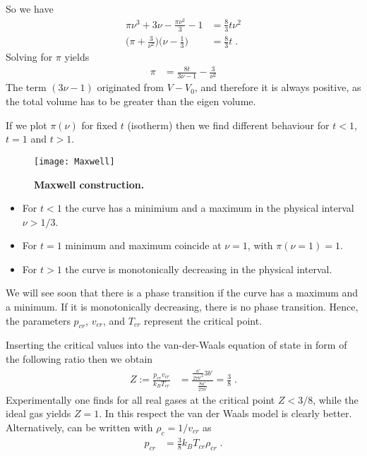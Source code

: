 %
So we have
%
\begin{align}\label{eq:auxaux}
\pi \nu^{3} + 3 \nu -  \frac{\pi \nu^{2}}{3} - 1 &= \frac{8}{3}t \nu^{2}\\
\bigg( \pi + \frac{3}{\nu^{2}} \bigg)\bigg( \nu - \frac{1}{3} \bigg) &=\frac{8}{3} t\;.
\end{align}
%
Solving for $\pi$ yields
%
\begin{align*}
\pi &= \frac{8t}{3 \nu-1 } - \frac{3}{\nu^{2}}
\end{align*}
%
The term $(3\nu-1)$ originated from $V-V_{0}$, and therefore it is always positive,
as the total volume has to be greater than the eigen volume. 

If we plot $\pi(\nu)$ for fixed $t$ (isotherm) then we find different behaviour for $t<1$, $t=1$ and $t>1$.
%
\begin{figure}[htbp]
\begin{center}
\texttt{[image: Maxwell]}
\caption{\bf Maxwell construction.}
\label{fig:Maxwell}
\end{center}
\end{figure}
%
\begin{itemize}
\item For $t<1$ the curve has a minimium and a maximum in the physical interval $\nu>1/3$.
\item For $t=1$ minimum and maximum coincide at $\nu=1$, with $\pi(\nu=1)=1$.
 \item For $t>1$ the curve is monotonically decreasing in the physical interval.
\end{itemize}
We will see soon that there is a phase transition if the curve has a maximum and a minimum.
 If it is monotonically decreasing, there is no phase transition. Hence, the parameters
 $p_{cr}$,  $v_{cr}$, and  $T_{cr}$ represent the  critical point.
 
 
Inserting the critical values into the van-der-Waals equation of state in form of the following ratio
then we obtain
%
\begin{align}\label{def:Z:cr}
Z:=\frac{p_{cr} v_{cr}}{k_{B} T_{cr}} &=  \frac{\frac{a'}{27 b'^{2}}3 b'}{\frac{8 a'}{27 b'}} =
\frac{3}{8}\;.
\end{align}
%
Experimentally one finds for all real gases at the critical point $Z<3/8$, while the ideal gas yields $Z=1$. In this respect the van der Waals model is clearly better.
Alternatively,  can be written with $\rho_{c}=1/v_{cr}$ as
%
\begin{align}\label{eq:p:cr}
p_{cr} &=\frac{3}{8} k_{B} T_{cr} \rho_{cr}\;.
\end{align}
%

